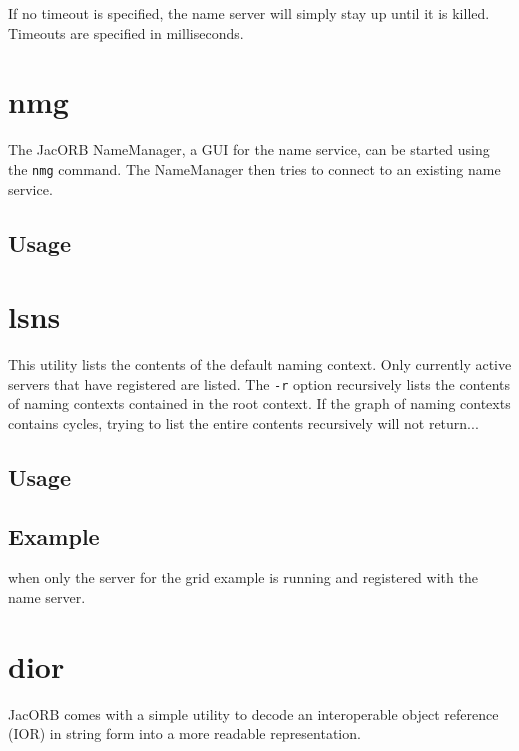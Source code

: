 \documentclass[12pt]{scrbook}
\begin{document}
If no timeout is specified, the name server will simply stay up until
it is killed. Timeouts are specified in milliseconds.

\section{nmg}

The JacORB  NameManager, a  GUI for the  name service, can  be started
using the {\tt nmg} command.  The NameManager then tries to connect to
an existing name service.

\subsection*{Usage}


\section{lsns}

This utility  lists the contents  of the default naming  context. Only
currently active servers that have registered are listed. The {\tt -r}
option recursively lists the  contents of naming contexts contained in
the root  context. If  the graph of  naming contexts  contains cycles,
trying to list the entire contents recursively will not return...

\subsection*{Usage}



\subsection*{Example}


when only the server for the grid example is running and registered
with the name server.


\section{dior}

JacORB comes with a simple utility to decode an interoperable object reference
(IOR) in string form into a more readable representation. 
\end{document}
